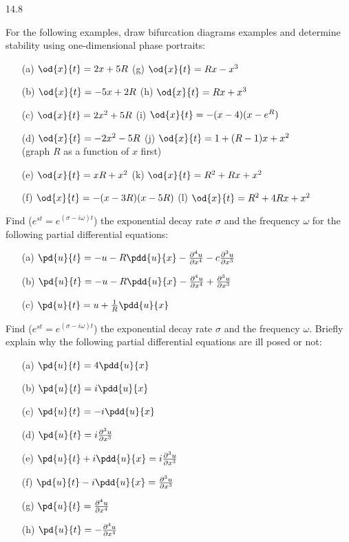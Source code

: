 \begin{exercises}{14.8}
\item For the following examples, draw bifurcation diagrams examples and determine stability using one-dimensional phase portraits:
\begin{enumerate}
\item[(a)] $\od{x}{t} = 2x + 5R$ \hfill (g) $\od{x}{t} = Rx - x^3$
\item[(b)] $\od{x}{t} = -5x + 2R$ \hfill (h) $\od{x}{t} = Rx + x^3$
\item[(c)] $\od{x}{t} = 2x^2 + 5R$ \hfill (i) $\od{x}{t} = -(x-4)(x-e^R)$
\item[(d)] $\od{x}{t} = -2x^2 - 5R$ \hfill (j) $\od{x}{t} = 1 + (R-1)x + x^2$\\
\hfill (graph $R$ as a function of $x$ first)
\item[(e)] $\od{x}{t} = xR + x^2$ \hfill (k) $\od{x}{t} = R^2 + Rx + x^2$
\item[(f)] $\od{x}{t} = -(x - 3R)(x - 5R)$ \hfill (l) $\od{x}{t} = R^2 + 4Rx + x^2$
\end{enumerate}

\item Find ($e^{st} = e^{(\sigma - i\omega)t}$) the exponential decay rate $\sigma$ and the frequency $\omega$ for the following partial differential equations:
\begin{enumerate}
\item[(a)] $\pd{u}{t} = -u - R\pdd{u}{x} - \frac{\partial^4 u}{\partial x^4} - c\frac{\partial^3 u}{\partial x^3}$
\item[\starred (b)] $\pd{u}{t} = -u - R\pdd{u}{x} - \frac{\partial^4 u}{\partial x^4} + \frac{\partial^3 u}{\partial x^3}$
\item[(c)] $\pd{u}{t} = u + \frac{1}{R}\pdd{u}{x}$
\end{enumerate}

\item Find ($e^{st} = e^{(\sigma - i\omega)t}$) the exponential decay rate $\sigma$ and the frequency $\omega$. Briefly explain why the following partial differential equations are ill posed or not:
\begin{enumerate}
\item[(a)] $\pd{u}{t} = 4\pdd{u}{x}$
\item[(b)] $\pd{u}{t} = i\pdd{u}{x}$
\item[\starred (c)] $\pd{u}{t} = -i\pdd{u}{x}$
\item[(d)] $\pd{u}{t} = i\frac{\partial^3 u}{\partial x^3}$
\item[(e)] $\pd{u}{t} + i\pdd{u}{x} = i\frac{\partial^3 u}{\partial x^3}$
\item[(f)] $\pd{u}{t} - i\pdd{u}{x} = \frac{\partial^3 u}{\partial x^3}$
\item[(g)] $\pd{u}{t} = \frac{\partial^4 u}{\partial x^4}$
\item[(h)] $\pd{u}{t} = -\frac{\partial^4 u}{\partial x^4}$
\end{enumerate}


\end{exercises}
